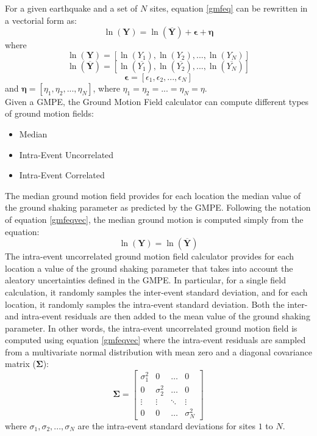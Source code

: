 For a given earthquake and a set of $N$ sites, equation \ref{gmfeq} 
can be rewritten in a vectorial form as:
\begin{equation}
\ln (\bm{Y}) = \ln (\overline{\bm{Y}})+\bm{\epsilon}+\bm{\eta} 
\label{gmfeqvec}
\end{equation}
where 
\[
{\ln (\bm{Y})}=[\ln (Y_{1}), \ln (Y_{2}),...,\ln (Y_{N})]
\]
\[
\ln (\overline{\bm{Y}})=[\ln (\overline{Y_{1}}), 
\ln (\overline{Y_{2}}),...,\ln (\overline{Y_{N}})]
\]
\[
\bm{\epsilon}=[\epsilon_{1},\epsilon_{2},...,\epsilon_{N}]
\]
and $\bm{\eta}=[\eta_{1},\eta_{2},...,\eta_{N}]$, 
where $\eta_{1}=\eta_{2}=...=\eta_{N}=\eta$.\\
Given a GMPE, the Ground Motion Field calculator can compute different types 
of ground motion fields:
\begin{itemize}
\item Median
\item Intra-Event Uncorrelated
\item Intra-Event Correlated
\end{itemize}
The median ground motion field provides for each location the median value of 
the ground shaking parameter as predicted by the GMPE. Following the notation 
of equation \ref{gmfeqvec}, the median ground motion is computed simply from 
the equation:
\begin{equation}
\ln (\bm{Y}) = \ln (\overline{\bm{Y}})
\end{equation}
The intra-event uncorrelated ground motion field calculator provides for each 
location a value of the ground shaking parameter that takes into account 
the aleatory uncertainties defined in the GMPE. In particular, for a single 
field calculation, it randomly samples the inter-event standard deviation, 
and for each location, it randomly samples the intra-event standard deviation.
%
Both the inter- and intra-event residuals are then added to the mean value of 
the ground shaking parameter. In other words, the intra-event uncorrelated 
ground motion field is computed using equation \ref{gmfeqvec} where the 
intra-event residuals are sampled from a multivariate normal distribution
with mean zero and a diagonal covariance matrix ($\bm{\Sigma}$):
\begin{equation}
\bm{\Sigma}=
\begin{bmatrix}
\sigma^{2}_{1} &  0  & \ldots & 0\\
0  &  \sigma^{2}_{2} & \ldots & 0\\
\vdots & \vdots & \ddots & \vdots\\
0  &   0       &\ldots & \sigma^{2}_{N}
\end{bmatrix}
\end{equation}
where $\sigma_{1}, \sigma_{2},...,\sigma_{N}$ are the intra-event standard 
deviations for sites $1$ to $N$.

